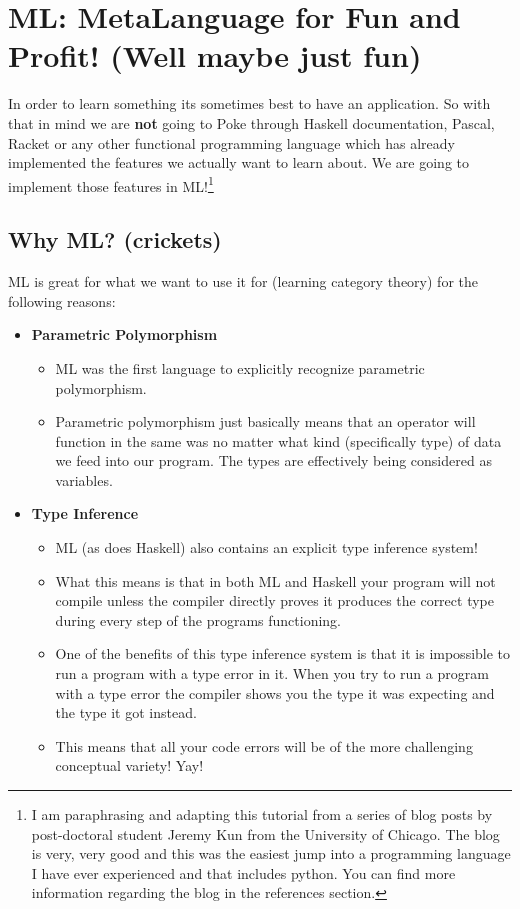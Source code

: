 \section{ML: MetaLanguage for Fun and Profit! (Well maybe just fun)}

In order to learn something its sometimes best to have an application. So with that in mind we are \textbf{not} going to Poke through Haskell documentation, Pascal, Racket or any other functional programming language which has already implemented the features we actually want to learn about. We are going to implement those features in ML!\footnote{I am paraphrasing and adapting this tutorial from a series of blog posts by post-doctoral student Jeremy Kun from the University of Chicago. The blog is very, very good and this was the easiest jump into a programming language I have ever experienced and that includes python. You can find more information regarding the blog in the references section.}  

\subsection{Why ML? (crickets)}

ML is great for what we want to use it for (learning category theory) for the following reasons:

\begin{itemize}
\item \textbf{Parametric Polymorphism}
\begin{itemize}
\item ML was the first language to explicitly recognize parametric polymorphism.
\item Parametric polymorphism just basically means that an operator will function in the same was no matter what kind (specifically type) of data we feed into our program. The types are effectively being considered as variables. 
\end{itemize}
\item \textbf{Type Inference}
\begin{itemize}
\item ML (as does Haskell) also contains an explicit type inference system!
\item What this means is that in both ML and Haskell your program will not compile unless the compiler directly proves it produces the correct type during every step of the programs functioning. 
\item One of the benefits of this type inference system is that it is impossible to run a program with a type error in it. When you try to run a program with a type error the compiler shows you the type it was expecting and the type it got instead.
\item This means that all your code errors will be of the more challenging conceptual variety! Yay!
\end{itemize}
\end{itemize}

